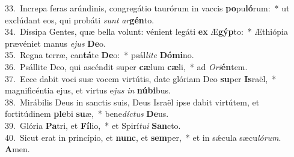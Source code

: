{33.~}Increpa feras arúndinis, congregátio taurórum in vaccis \textbf{po}pu\textbf{ló}rum:~* ut exclúdant eos, qui probáti \textit{sunt} \textit{ar}\textbf{gén}to.\\
{34.~}Díssipa Gentes, quæ bella volunt: vénient legáti \textbf{ex} Æ\textbf{gýp}to:~* Æthiópia prævéniet manus \textit{e}\textit{jus} \textbf{De}o.\\
{35.~}Regna terræ, can\textbf{tá}te \textbf{De}o:~* psál\textit{li}\textit{te} \textbf{Dó}\textbf{mi}no.\\
{36.~}Psállite Deo, qui ascéndit super \textbf{cæ}lum \textbf{cæ}li,~* ad \textit{O}\textit{ri}\textbf{én}tem.\\
{37.~}Ecce dabit voci suæ vocem virtútis, date glóriam Deo \textbf{su}per \textbf{Is}raël,~* magnificéntia ejus, et virtus e\textit{jus} \textit{in} \textbf{nú}\textbf{bi}bus.\\
{38.~}Mirábilis Deus in sanctis suis, Deus Israël ipse dabit virtútem, et fortitúdinem \textbf{ple}bi \textbf{su}æ,~* bene\textit{dí}\textit{ctus} \textbf{De}us.\\
{39.~}Glória \textbf{Pa}tri, et \textbf{Fí}lio,~* et Spirí\textit{tu}\textit{i} \textbf{San}cto.\\
{40.~}Sicut erat in princípio, et \textbf{nunc}, et \textbf{sem}per,~* et in sǽcula sæcu\textit{ló}\textit{rum}. \textbf{A}men.\\
